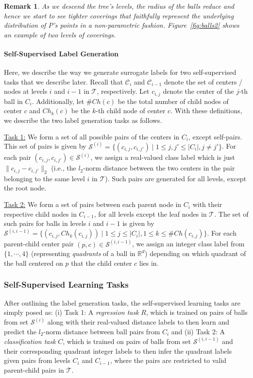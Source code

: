 \documentclass{article}
\newcommand{\mC}{\mathcal{C}}
\newcommand{\mS}{\mathcal{S}}
\newcommand{\mT}{\mathcal{T}}
\newtheorem{remark}{Remark}
\begin{document}
\begin{remark}
As we descend the tree's levels, the radius of the balls reduce and hence we start to see \emph{tighter} coverings that faithfully represent the underlying distribution of $P$'s points in a non-parametric fashion. Figure~\ref{fig:balls2} shows an example of two levels of coverings.
\end{remark}


\paragraph{Self-Supervised Label Generation}
Here, we describe the way we generate surrogate labels for two self-supervised tasks that we describe later.
Recall that $\mC_i$ and $\mC_{i-1}$ denote the set of centers / nodes at levels $i$ and $i-1$ in $\mT$, respectively.
Let $c_{i,j}$ denote the center of the $j$-th ball in $C_i$. 
Additionally, let $\#Ch(c)$ be the total number of child nodes of center $c$ and $Ch_k(c)$ be the $k$-th child node of center $c$.
With these definitions, we describe the two label generation tasks as follows.

\underline{Task 1:} We form a set of all possible pairs of the centers in $C_i$, except self-pairs. This set of pairs is given by $\mS^{(i)} = \{  (c_{i,j}, c_{i,j'}  ) \mid 1 \leq j,j' \leq |C_i|, j \neq j'  \}$. 
For each pair $(c_{i,j}, c_{i,j'}  ) \in \mS^{(i)} $, we assign a real-valued class label which is just 
$\lVert c_{i,j} -  c_{i,j'} \rVert_2$ (i.e., the $l_2$-norm distance between the two centers in the pair belonging to the same level $i$ in $\mT$). Such pairs are generated for all levels, except the root node.

\underline{Task 2:} We form a set of pairs between each parent node in $C_i$ with their respective child nodes in 
$C_{i-1}$, for all levels except the leaf nodes in $\mT$. The set of such pairs for balls in levels $i$ and $i-1$ 
is given by 
$\mS^{(i,i-1)} = \{  (c_{i,j}, Ch_k(c_{i,j})  ) \mid  1 \leq j \leq |C_i|, 1 \leq k \leq \#Ch(c_{i,j}) \}$. 
For each parent-child center pair $(p,c) \in \mS^{(i,i-1)}$, we assign an integer class label from $\{1,\cdots,4\}$ (representing \emph{quadrants} of a ball in $\mathds{R}^d$) depending on which quadrant of the ball centered on $p$ that the child center $c$ lies in.


\subsubsection{Self-Supervised Learning Tasks}
\label{ssec:selfsup}
After outlining the label generation tasks, the self-supervised learning tasks are simply posed as:
(i) Task 1: A \emph{regression task} $R$, which is trained on pairs of balls from set $\mS^{(i)}$ along with their 
real-valued distance labels to then learn and predict the $l_2$-norm distance between ball pairs from $C_i$ and 
(ii) Task 2: A \emph{classification task} $C$, which is trained on pairs of balls from set $\mS^{(i,i-1)}$ and their corresponding quadrant integer labels to then infer the quadrant labels given pairs from levels $C_i$ and $C_{i-1}$, where the pairs are restricted to valid parent-child pairs in $\mT$. 
\end{document}
